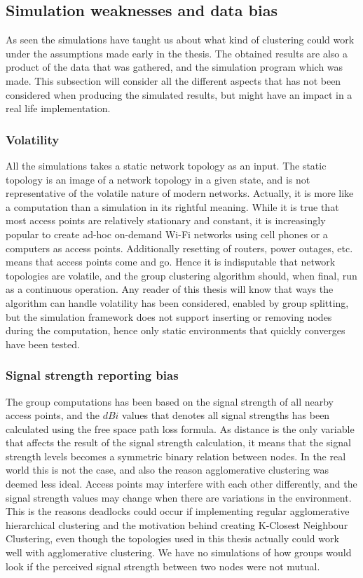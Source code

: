 \subsection{Simulation weaknesses and data bias}
As seen the simulations have taught us about what kind of clustering could work under the assumptions made early in the thesis. The obtained results are also 
a product of the data that was gathered, and the simulation program which was made. This subsection will consider all the different aspects that has not been considered
when producing the simulated results, but might have an impact in a real life implementation. 

\subsubsection{Volatility} 
All the simulations takes a static network topology as an input. The static topology is an image of a network topology in a given state, and is not representative
of the volatile nature of modern networks. Actually, it is more like a computation than a simulation in its rightful meaning.
While it is true that most access points are relatively stationary and constant, it is increasingly popular to create ad-hoc on-demand Wi-Fi
networks using cell phones or a computers as access points. Additionally resetting of routers, power outages, etc. means that access points come and go. 
Hence it is indisputable that network topologies are volatile, and the group clustering algorithm should, when final, run as a continuous operation. 
Any reader of this thesis will know that ways the algorithm can handle volatility has been considered, enabled by group splitting,
but the simulation framework does not support inserting or removing nodes during the computation, hence only static environments that quickly converges have been tested. 

\subsubsection{Signal strength reporting bias}
The group computations has been based on the signal strength of all nearby access points, and the $dBi$ values that denotes all signal strengths has been calculated using the
free space path loss formula. As distance is the only variable that affects the result of the signal strength calculation,
it means that the signal strength levels becomes a symmetric binary relation between nodes. In the real world this is not the case, and also the reason agglomerative clustering was deemed
less ideal. Access points may interfere with each other differently, and the signal strength values may change when there are variations in the environment. This is the reasons deadlocks could
occur if implementing regular agglomerative hierarchical clustering and the motivation behind creating K-Closest Neighbour Clustering, even though the topologies used in this thesis actually
could work well with agglomerative clustering. We have no simulations of how groups would look if the perceived signal strength between two nodes were not mutual.

